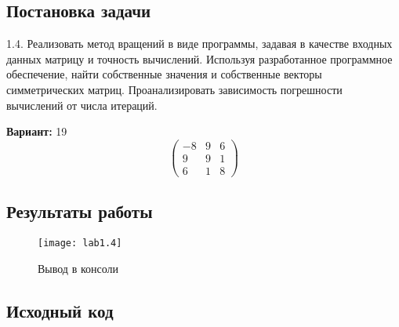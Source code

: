 \subsection{Постановка задачи}
1.4. Реализовать метод вращений в виде программы, задавая в качестве входных данных матрицу и точность вычислений. Используя разработанное программное обеспечение, найти собственные значения и собственные векторы симметрических матриц. Проанализировать зависимость погрешности вычислений от числа итераций. 

{\bfseries Вариант:} 19
\begin{equation}
      \begin{pmatrix}
        -8 & 9 & 6\\
        9 & 9 & 1\\
        6 & 1 & 8
      \end{pmatrix}
\end{equation}
\pagebreak

\subsection{Результаты работы}

\begin{figure}[h!]
\centering
\texttt{[image: lab1.4]}
\caption{Вывод в консоли}
\end{figure}
\pagebreak

\vfill

\subsection{Исходный код}


\pagebreak
